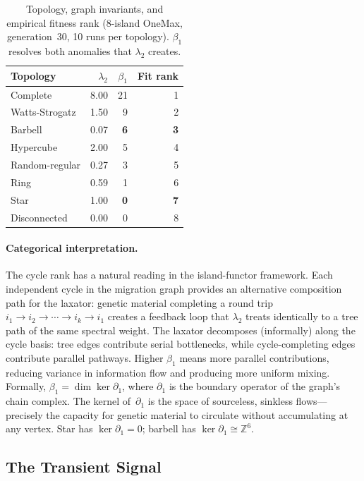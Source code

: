 \begin{table}[ht]
\centering
\caption{Topology, graph invariants, and empirical fitness rank
  (8-island OneMax, generation~30, 10 runs per topology).  $\beta_1$
  resolves both anomalies that $\lambda_2$ creates.}
\label{tab:cycle-rank}
\small
\begin{tabular}{@{}lrrr@{}}
\toprule
\textbf{Topology} & $\lambda_2$ & $\beta_1$ & \textbf{Fit rank} \\
\midrule
Complete         & 8.00 & 21 & 1 \\
Watts-Strogatz   & 1.50 &  9 & 2 \\
Barbell          & 0.07 &  \textbf{6} & \textbf{3} \\
Hypercube        & 2.00 &  5 & 4 \\
Random-regular   & 0.27 &  3 & 5 \\
Ring             & 0.59 &  1 & 6 \\
Star             & 1.00 &  \textbf{0} & \textbf{7} \\
Disconnected     & 0.00 &  0 & 8 \\
\bottomrule
\end{tabular}
\end{table}


\paragraph{Categorical interpretation.}
The cycle rank has a natural reading in the island-functor framework.
Each independent cycle in the migration graph provides an alternative
composition path for the laxator: genetic material completing a round
trip $i_1 \to i_2 \to \cdots \to i_k \to i_1$ creates a feedback loop
that $\lambda_2$ treats identically to a tree path of the same spectral
weight.  The laxator decomposes (informally) along the cycle basis:
tree edges contribute serial bottlenecks, while cycle-completing edges
contribute parallel pathways.  Higher $\beta_1$ means more parallel
contributions, reducing variance in information flow and producing more
uniform mixing.  Formally, $\beta_1 = \dim\ker\partial_1$, where
$\partial_1$ is the boundary operator of the graph's chain complex.
The kernel of~$\partial_1$ is the space of sourceless, sinkless
flows---precisely the capacity for genetic material to circulate without
accumulating at any vertex.  Star has $\ker\partial_1 = 0$; barbell
has $\ker\partial_1 \cong \mathbb{Z}^6$.


\subsection{The Transient Signal}
\label{sec:transient}

